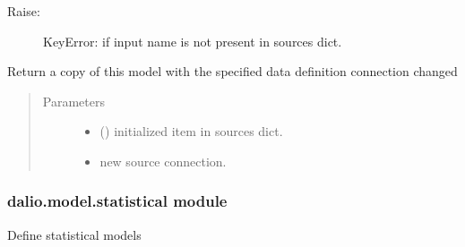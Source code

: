 \documentclass[letterpaper,10pt,english]{sphinxmanual}
\begin{document}
\begin{fulllineitems}
\begin{fulllineitems}
\begin{quote}
\begin{description}
\end{description}\end{quote}
\begin{description}
\item[{Raise:}] \leavevmode
KeyError: if input name is not present in sources dict.

\end{description}

\end{fulllineitems}


\begin{fulllineitems}
\label{\detokenize{dalio.model:dalio.model.model.Model.with_input}}
Return a copy of this model with the specified data definition
connection changed
\begin{quote}\begin{description}
\item[{Parameters}] \leavevmode\begin{itemize}
\item {} 
 () \textendash{} initialized item in sources dict.

\item {} 
 \textendash{} new source connection.

\end{itemize}

\end{description}\end{quote}

\end{fulllineitems}


\end{fulllineitems}



\subsubsection{dalio.model.statistical module}
\label{\detokenize{dalio.model:module-dalio.model.statistical}}\label{\detokenize{dalio.model:dalio-model-statistical-module}}
Define statistical models
\end{document}
